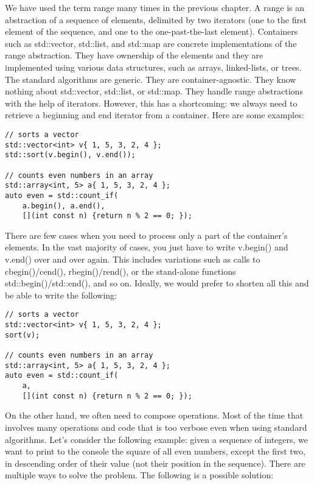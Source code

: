 We have used the term range many times in the previous chapter. A range is an abstraction of a sequence of elements, delimited by two iterators (one to the first element of the sequence, and one to the one-past-the-last element). Containers such as std::vector, std::list, and std::map are concrete implementations of the range abstraction. They have ownership of the elements and they are implemented using various data structures, such as arrays, linked-lists, or trees. The standard algorithms are generic. They are container-agnostic. They know nothing about std::vector, std::list, or std::map. They handle range abstractions with the help of iterators. However, this has a shortcoming: we always need to retrieve a beginning and end iterator from a container. Here are some examples:

\begin{lstlisting}[style=styleCXX]
// sorts a vector
std::vector<int> v{ 1, 5, 3, 2, 4 };
std::sort(v.begin(), v.end());

// counts even numbers in an array
std::array<int, 5> a{ 1, 5, 3, 2, 4 };
auto even = std::count_if(
	a.begin(), a.end(),
	[](int const n) {return n % 2 == 0; });
\end{lstlisting}

There are few cases when you need to process only a part of the container’s elements. In the vast majority of cases, you just have to write v.begin() and v.end() over and over again. This includes variations such as calls to cbegin()/cend(), rbegin()/rend(), or the stand-alone functions std::begin()/std::end(), and so on. Ideally, we would prefer to shorten all this and be able to write the following:

\begin{lstlisting}[style=styleCXX]
// sorts a vector
std::vector<int> v{ 1, 5, 3, 2, 4 };
sort(v);

// counts even numbers in an array
std::array<int, 5> a{ 1, 5, 3, 2, 4 };
auto even = std::count_if(
	a,
	[](int const n) {return n % 2 == 0; });
\end{lstlisting}

On the other hand, we often need to compose operations. Most of the time that involves many operations and code that is too verbose even when using standard algorithms. Let’s consider the following example: given a sequence of integers, we want to print to the console the square of all even numbers, except the first two, in descending order of their value (not their position in the sequence). There are multiple ways to solve the problem. The following is a possible solution:

